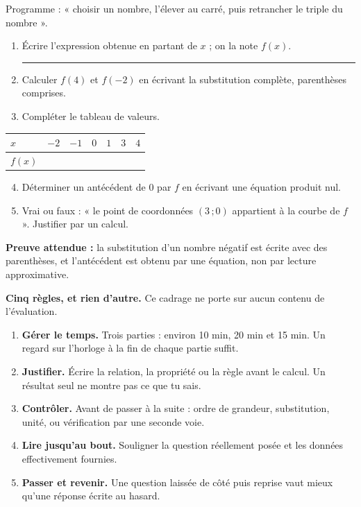 \documentclass[10pt,a4paper]{article}
\begin{document}
Programme : « choisir un nombre, l'élever au carré, puis retrancher le triple du nombre ».
\begin{enumerate}
\item Écrire l'expression obtenue en partant de $x$ ; on la note $f(x)$. \rule{50mm}{0.32pt}
\item Calculer $f(4)$ et $f(-2)$ en écrivant la substitution complète, parenthèses comprises.
\item Compléter le tableau de valeurs.
\end{enumerate}
\par\noindent\begin{tabularx}{\linewidth}{|>{\bfseries}p{18mm}|X|X|X|X|X|X|}
\hline
$x$ & $-2$ & $-1$ & $0$ & $1$ & $3$ & $4$ \\ \hline
$f(x)$ & & & & & & \\ \hline
\end{tabularx}
\begin{enumerate}\setcounter{enumi}{3}
\item Déterminer un antécédent de $0$ par $f$ en écrivant une équation produit nul.
\item Vrai ou faux : « le point de coordonnées $(3\,;0)$ appartient à la courbe de $f$ ». Justifier par un calcul.
\end{enumerate}

\begin{successbox}
\textbf{Preuve attendue :} la substitution d'un nombre négatif est écrite avec des parenthèses, et l'antécédent
est obtenu par une équation, non par lecture approximative.
\end{successbox}

\needspace{62mm}\par\vspace{3mm}

\begin{methodbox}
\textbf{Cinq règles, et rien d'autre.} Ce cadrage ne porte sur aucun contenu de l'évaluation.
\begin{enumerate}
\item \textbf{Gérer le temps.} Trois parties : environ 10 min, 20 min et 15 min. Un regard sur l'horloge à la fin de chaque partie suffit.
\item \textbf{Justifier.} Écrire la relation, la propriété ou la règle avant le calcul. Un résultat seul ne montre pas ce que tu sais.
\item \textbf{Contrôler.} Avant de passer à la suite : ordre de grandeur, substitution, unité, ou vérification par une seconde voie.
\item \textbf{Lire jusqu'au bout.} Souligner la question réellement posée et les données effectivement fournies.
\item \textbf{Passer et revenir.} Une question laissée de côté puis reprise vaut mieux qu'une réponse écrite au hasard.
\end{enumerate}
\end{methodbox}
\end{document}
